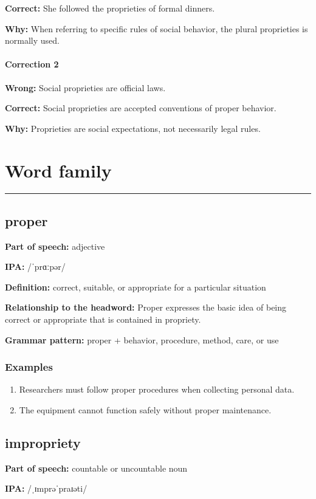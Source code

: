 \documentclass[11pt]{article}
\newcommand{\sectionrule}{\par\vspace{-0.5em}\noindent\textcolor{Accent}{\rule{\linewidth}{0.6pt}}\par}
\begin{document}
\textbf{Correct:} She followed the proprieties of formal dinners.

\textbf{Why:} When referring to specific rules of social behavior, the plural proprieties is normally used.

\paragraph{Correction 2}
\textbf{Wrong:} Social proprieties are official laws.

\textbf{Correct:} Social proprieties are accepted conventions of proper behavior.

\textbf{Why:} Proprieties are social expectations, not necessarily legal rules.

\section{Word family}
\sectionrule
\subsection{proper}
\textbf{Part of speech:} adjective

\textbf{IPA:} /ˈprɑːpər/

\textbf{Definition:} correct, suitable, or appropriate for a particular situation

\textbf{Relationship to the headword:} Proper expresses the basic idea of being correct or appropriate that is contained in propriety.

\textbf{Grammar pattern:} proper + behavior, procedure, method, care, or use

\subsubsection{Examples}
\begin{enumerate}
  \item Researchers must follow proper procedures when collecting personal data.
  \item The equipment cannot function safely without proper maintenance.
\end{enumerate}

\subsection{impropriety}
\textbf{Part of speech:} countable or uncountable noun

\textbf{IPA:} /ˌɪmprəˈpraɪəti/
\end{document}
